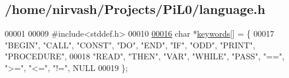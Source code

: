 \hypertarget{language_8h_source}{\subsection{/home/nirvash/\-Projects/\-Pi\-L0/language.h}
}

\begin{DoxyCode}
00001 
00009 \textcolor{preprocessor}{#include<stddef.h>}
00010 
\hypertarget{language_8h_source_l00016}{}\hyperlink{language_8h_a378b0ae598a7cfd7eb28be463d4cc909}{00016} \textcolor{keywordtype}{char} *\hyperlink{language_8h_a378b0ae598a7cfd7eb28be463d4cc909}{keywords}[] = \{
00017   \textcolor{stringliteral}{"BEGIN"}, \textcolor{stringliteral}{"CALL"}, \textcolor{stringliteral}{"CONST"}, \textcolor{stringliteral}{"DO"}, \textcolor{stringliteral}{"END"}, \textcolor{stringliteral}{"IF"}, \textcolor{stringliteral}{"ODD"}, \textcolor{stringliteral}{"PRINT"}, \textcolor{stringliteral}{"PROCEDURE"},
00018   \textcolor{stringliteral}{"READ"}, \textcolor{stringliteral}{"THEN"}, \textcolor{stringliteral}{"VAR"}, \textcolor{stringliteral}{"WHILE"}, \textcolor{stringliteral}{"PASS"}, \textcolor{stringliteral}{"=="}, \textcolor{stringliteral}{">="}, \textcolor{stringliteral}{"<="}, \textcolor{stringliteral}{"!="}, NULL
00019 \};
\end{DoxyCode}
